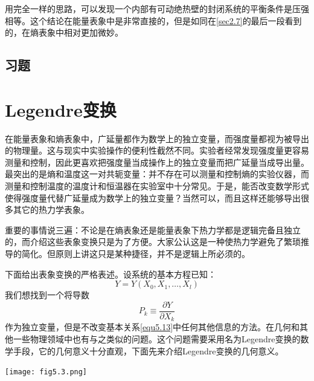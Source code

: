 用完全一样的思路，可以发现一个内部有可动绝热壁的封闭系统的平衡条件是压强相等。这个结论在能量表象中是非常直接的，但是如同在\ref{sec2.7}的最后一段看到的，在熵表象中相对更加微妙。

\subsection*{习题}

\section{Legendre变换}
\label{sec5.2}

在能量表象和熵表象中，广延量都作为数学上的独立变量，而强度量都视为被导出的物理量。这与现实中实验操作的便利性截然不同。实验者经常发现强度量更容易测量和控制，因此更喜欢把强度量当成操作上的独立变量而把广延量当成导出量。最突出的是熵和温度这一对共轭变量：并不存在可以测量和控制熵的实验仪器，而测量和控制温度的温度计和恒温器在实验室中十分常见。于是，能否改变数学形式使得强度量代替广延量成为数学上的独立变量？当然可以，而且这样还能够导出很多其它的热力学表象。

重要的事情说三遍：不论是在熵表象还是能量表象下热力学都是逻辑完备且独立的，而介绍这些表象变换只是为了方便。大家公认这是一种使热力学避免了繁琐推导的简化。但原则上讲这只是某种捷径，并不是逻辑上所必须的。

下面给出表象变换的严格表述。设系统的基本方程已知：
\begin{equation}
\label{equ5.13}
	Y=Y(X_0,X_1,\ldots,X_l)
\end{equation}
我们想找到一个将导数
\begin{equation}
\label{equ5.14}
	P_k\equiv\frac{\partial Y}{\partial X_k}
\end{equation}
作为独立变量，但是不改变基本关系\eqref{equ5.13}中任何其他信息的方法。在几何和其他一些物理领域中也有与之类似的问题。这个问题需要采用名为Legendre变换的数学手段，它的几何意义十分直观，下面先来介绍Legendre变换的几何意义。

{
	\centering
	\texttt{[image: fig5.3.png]}
	\figcaption{}
	\label{fig5.3}
}

